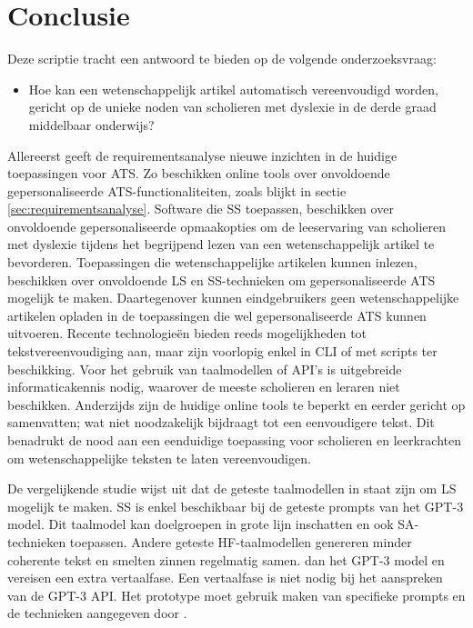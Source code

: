 
\chapter{Conclusie}%
\label{ch:conclusie}

Deze scriptie tracht een antwoord te bieden op de volgende onderzoeksvraag:

\begin{itemize}
	\item Hoe kan een wetenschappelijk artikel automatisch vereenvoudigd worden, gericht op de unieke noden van scholieren met dyslexie in de derde graad middelbaar onderwijs?
\end{itemize}

Allereerst geeft de requirementsanalyse nieuwe inzichten in de huidige toepassingen voor ATS. Zo beschikken online tools over onvoldoende gepersonaliseerde ATS-functionaliteiten, zoals blijkt in sectie \ref{sec:requirementsanalyse}. Software die SS toepassen, beschikken over onvoldoende gepersonaliseerde opmaakopties om de leeservaring van scholieren met dyslexie tijdens het begrijpend lezen van een wetenschappelijk artikel te bevorderen. Toepassingen die wetenschappelijke artikelen kunnen inlezen, beschikken over onvoldoende LS en SS-technieken om gepersonaliseerde ATS mogelijk te maken. Daartegenover kunnen eindgebruikers geen wetenschappelijke artikelen opladen in de toepassingen die wel gepersonaliseerde ATS kunnen uitvoeren. Recente technologieën bieden reeds mogelijkheden tot tekstvereenvoudiging aan, maar zijn voorlopig enkel in CLI of met scripts ter beschikking. Voor het gebruik van taalmodellen of API's is uitgebreide informaticakennis nodig, waarover de meeste scholieren en leraren niet beschikken. Anderzijds zijn de huidige online tools te beperkt en eerder gericht op samenvatten; wat niet noodzakelijk bijdraagt tot een eenvoudigere tekst. Dit benadrukt de nood aan een eenduidige toepassing voor scholieren en leerkrachten om wetenschappelijke teksten te laten vereenvoudigen.

\medspace

De vergelijkende studie wijst uit dat de geteste taalmodellen in staat zijn om LS mogelijk te maken. SS is enkel beschikbaar bij de geteste prompts van het GPT-3 model. Dit taalmodel kan doelgroepen in grote lijn inschatten en ook SA-technieken toepassen. Andere geteste HF-taalmodellen genereren minder coherente tekst en smelten zinnen regelmatig samen. dan het GPT-3 model en vereisen een extra vertaalfase. Een vertaalfase is niet nodig bij het aanspreken van de GPT-3 API. Het prototype moet gebruik maken van specifieke prompts en de technieken aangegeven door \textcite{McFarland2023, White2023}.

